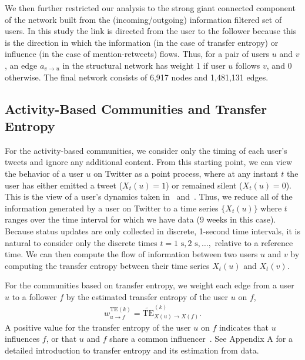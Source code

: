 We then further restricted our analysis to the strong giant connected component of the network built from the (incoming/outgoing) information filtered set of users. %
In this study the link is directed from the user to the follower because this is the direction in which the information (in the case of transfer entropy) or influence (in the case of mention-retweets) flows. Thus, for a pair of users $u$ and $v$, an edge $a_{v \to u}$ in the structural network has weight 1 if user $u$ follows $v$, and 0 otherwise. The final network consists of 6,917 nodes and 1,481,131 edges.

\subsection{Activity-Based Communities and Transfer Entropy}
\label{sec:method-activity}

For the activity-based communities, we consider only the timing of each user's tweets and ignore any additional content. From this starting point, we can view the behavior of a user $u$ on Twitter as a point process, where at any instant $t$ the user has either emitted a tweet ($X_{t}(u) = 1$) or remained silent ($X_{t}(u) = 0$). This is the view of a user's dynamics taken in~\cite{ver2012information} and~\cite{darmon2013understanding}. Thus, we reduce all of the information generated by a user on Twitter to a time series $\{ X_{t}(u)\}$ where $t$ ranges over the time interval for which we have data (9 weeks in this case). Because status updates are only collected in discrete, 1-second time intervals, it is natural to consider only the discrete times $t = 1 \text{ s}, 2 \text{ s}, \ldots, $ relative to a reference time. We can then compute the flow of information between two users $u$ and $v$ by computing the transfer entropy between their time series $X_{t}(u)$ and $X_{t}(v).$

For the communities based on transfer entropy, we weight each edge from a user $u$ to a follower $f$ by the estimated transfer entropy of the user $u$ on $f$, 
\begin{align}
	w_{u \to f}^{\text{TE}(k)} = \widetilde{\text{TE}}_{X(u) \to X(f)}^{(k)}. \label{Eqn-EW-activity}
\end{align}
A positive value for the transfer entropy of the user $u$ on $f$ indicates that $u$ influences $f$, or that $u$ and $f$ share a common influencer~\cite{ver2012information}. See Appendix A for a detailed introduction to transfer entropy and its estimation from data.

